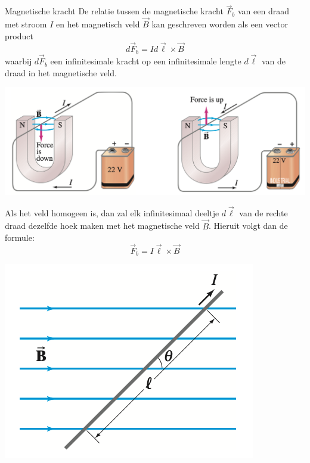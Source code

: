 \begin{theo}{Magnetische kracht}
    De relatie tussen de magnetische kracht $\Vec{F}_b$ van een draad met stroom $I$ en het magnetisch veld $\Vec{B}$ kan geschreven worden als een vector product
    \begin{equation*}
        d\Vec{F}_b = Id\Vec{\ell} \times \Vec{B}
    \end{equation*}
    waarbij $d\Vec{F}_b$ een infinitesimale kracht op een infinitesimale lengte $d\Vec{\ell}$ van de draad in het magnetische veld.
    \begin{center}
        \includegraphics[scale = 0.45]{Images/Magnetisme/MagnetischeKracht}
    \end{center}
    \begin{minipage}{.75\textwidth}
        Als het veld homogeen is, dan zal elk infinitesimaal deeltje $d\Vec{\ell}$ van de rechte draad dezelfde hoek maken met het magnetische veld $\Vec{B}$.
        Hieruit volgt dan de formule:
        \begin{equation*}
            \Vec{F}_b = I\Vec{\ell} \times \Vec{B}
        \end{equation*}
    \end{minipage}
    \begin{minipage}{.21\textwidth}
        \includegraphics[scale = 0.25]{Images/Magnetisme/DraadHomogeenVeld}
    \end{minipage}
\end{theo}

